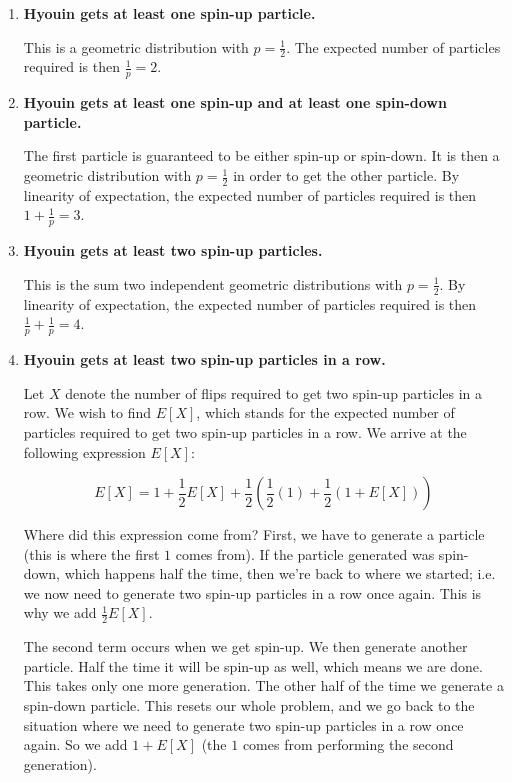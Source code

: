 \documentclass{article}
\begin{document}
\begin{enumerate}[label=(\alph*)]
    \item \textbf{Hyouin gets at least one spin-up particle.}
    
    This is a geometric distribution with $p = \frac{1}{2}$. The expected number of particles required is then $\frac{1}{p} = \boxed{2}$.

    \vspace{1cm}
    
    \item \textbf{Hyouin gets at least one spin-up and at least one spin-down particle.}
    
    The first particle is guaranteed to be either spin-up or spin-down. It is then a geometric distribution with $p = \frac{1}{2}$ in order to get the other particle. By linearity of expectation, the expected number of particles required is then $1 + \frac{1}{p} = \boxed{3}$.

    \vspace{1cm}
    
    \item \textbf{Hyouin gets at least two spin-up particles.}
    
    This is the sum two independent geometric distributions with $p = \frac{1}{2}$. By linearity of expectation, the expected number of particles required is then $\frac{1}{p} + \frac{1}{p} = \boxed{4}$.

    \vspace{1cm}
    
    \item \textbf{Hyouin gets at least two spin-up particles in a row.}
    
    Let $X$ denote the number of flips required to get two spin-up particles in a row. We wish to find $E[X]$, which stands for the expected number of particles required to get two spin-up particles in a row. We arrive at the following expression $E[X]$:
    
    $$E[X] = 1 + \frac{1}{2}E[X] + \frac{1}{2}\left(\frac{1}{2} (1) + \frac{1}{2} (1 + E[X])\right)$$
    
    Where did this expression come from? First, we have to generate a particle (this is where the first $1$ comes from). If the particle generated was spin-down, which happens half the time, then we're back to where we started; i.e. we now need to generate two spin-up particles in a row once again. This is why we add $\frac{1}{2}E[X]$.
    
    The second term occurs when we get spin-up. We then generate another particle. Half the time it will be spin-up as well, which means we are done. This takes only one more generation. The other half of the time we generate a spin-down particle. This resets our whole problem, and we go back to the situation where we need to generate two spin-up particles in a row once again. So we add $1 + E[X]$ (the $1$ comes from performing the second generation). 
    

\end{enumerate}
\end{document}
